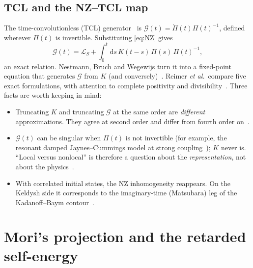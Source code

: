 \documentclass[11pt]{article}
\newcommand{\Lc}{\mathcal{L}}
\newcommand{\Gc}{\mathcal{G}}
\newcommand{\dd}{\mathrm{d}}
\begin{document}
\subsection{TCL and the NZ--TCL map}
The time-convolutionless (TCL) generator~\cite{Shibata1977,Chaturvedi1979} is
$\Gc(t)=\dot\Pi(t)\Pi(t)^{-1}$, defined wherever $\Pi(t)$ is invertible. Substituting \cref{eq:NZ} gives
\begin{equation}
  \Gc(t)=\Lc_S+\int_0^t\!\dd s\,K(t-s)\,\Pi(s)\,\Pi(t)^{-1},
  \label{eq:TCLNZ}
\end{equation}
an exact relation. Nestmann, Bruch and Wegewijs turn it into a fixed-point equation that
generates $\Gc$ from $K$ (and conversely)~\cite{Nestmann2021}. Reimer
\emph{et al.}\ compare five exact formulations, with attention to complete positivity
and divisibility~\cite{Reimer2019}. Three facts are worth keeping in mind:
\begin{itemize}\itemsep0pt
\item Truncating $K$ and truncating $\Gc$ at the same order are \emph{different} approximations.
  They agree at second order and differ from fourth order on~\cite{LeijnseWegewijs2008,Timm2008,Timm2011}.
\item $\Gc(t)$ can be singular when $\Pi(t)$ is not invertible (for example, the resonant damped
  Jaynes--Cummings model at strong coupling~\cite{BreuerPetruccione}); $K$ never is.
  ``Local versus nonlocal'' is therefore a question about the \emph{representation}, not
  about the physics~\cite{ChruscinskiKossakowski2010}.
\item With correlated initial states, the NZ inhomogeneity reappears. On the Keldysh side
  it corresponds to the imaginary-time (Matsubara) leg of the Kadanoff--Baym
  contour~\cite{StefanucciVanLeeuwen}.
\end{itemize}

\section{Mori's projection and the retarded self-energy}
\label{sec:mori}
\end{document}
